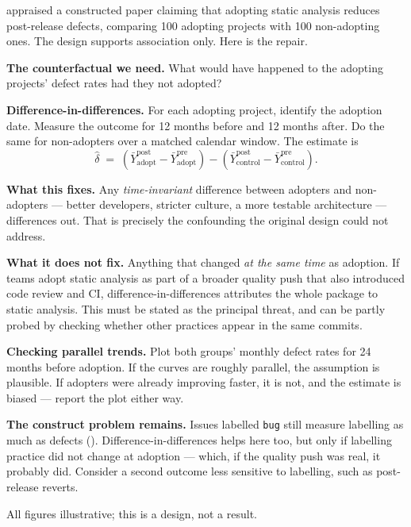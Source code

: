 \begin{worked}
 appraised a constructed paper claiming that adopting static
analysis reduces post-release defects, comparing 100 adopting projects with 100
non-adopting ones. The design supports association only. Here is the repair.

\medskip
\textbf{The counterfactual we need.} What would have happened to the adopting
projects' defect rates had they not adopted?

\medskip
\textbf{Difference-in-differences.} For each adopting project, identify the
adoption date. Measure the outcome for 12 months before and 12 months after.
Do the same for non-adopters over a matched calendar window. The estimate is
\[
\hat\delta \;=\; (\bar Y^{\text{post}}_{\text{adopt}} - \bar Y^{\text{pre}}_{\text{adopt}})
              - (\bar Y^{\text{post}}_{\text{control}} - \bar Y^{\text{pre}}_{\text{control}}).
\]

\medskip
\textbf{What this fixes.} Any \emph{time-invariant} difference between adopters
and non-adopters --- better developers, stricter culture, a more testable
architecture --- differences out. That is precisely the confounding the
original design could not address.

\medskip
\textbf{What it does not fix.} Anything that changed \emph{at the same time} as
adoption. If teams adopt static analysis as part of a broader quality push that
also introduced code review and CI, difference-in-differences attributes the
whole package to static analysis. This must be stated as the principal threat,
and can be partly probed by checking whether other practices appear in the same
commits.

\medskip
\textbf{Checking parallel trends.} Plot both groups' monthly defect rates for
24 months before adoption. If the curves are roughly parallel, the assumption
is plausible. If adopters were already improving faster, it is not, and the
estimate is biased --- report the plot either way.

\medskip
\textbf{The construct problem remains.} Issues labelled \texttt{bug} still
measure labelling as much as defects (). Difference-in-differences
helps here too, but only if labelling practice did not change at adoption ---
which, if the quality push was real, it probably did. Consider a second outcome
less sensitive to labelling, such as post-release reverts.

\medskip
All figures illustrative; this is a design, not a result.
\end{worked}

